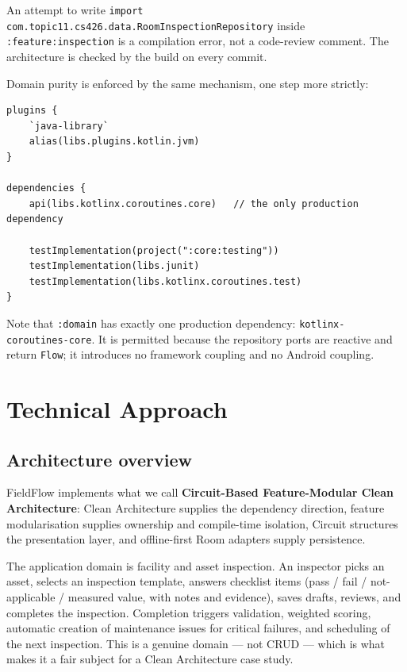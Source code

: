 \documentclass[11pt,a4paper]{article}
\newcommand{\mdl}[1]{\texttt{#1}}
\newcommand{\file}[1]{{\small\texttt{#1}}}
\begin{document}
An attempt to write \texttt{import com.topic11.cs426.data.RoomInspectionRepository}
inside \mdl{:feature:inspection} is a compilation error, not a code-review
comment. The architecture is checked by the build on every commit.

Domain purity is enforced by the same mechanism, one step more strictly:

\begin{lstlisting}[caption={\file{domain/build.gradle.kts} --- \mdl{:domain} is a
\texttt{java-library}, not an Android library. The Android SDK, Compose, Circuit
and Room are not available to it at all.}]
plugins {
    `java-library`
    alias(libs.plugins.kotlin.jvm)
}

dependencies {
    api(libs.kotlinx.coroutines.core)   // the only production dependency

    testImplementation(project(":core:testing"))
    testImplementation(libs.junit)
    testImplementation(libs.kotlinx.coroutines.test)
}
\end{lstlisting}

Note that \mdl{:domain} has exactly one production dependency:
\texttt{kotlinx-coroutines-core}. It is permitted because the repository ports
are reactive and return \texttt{Flow}; it introduces no framework coupling and
no Android coupling.

\section{Technical Approach}

\subsection{Architecture overview}

FieldFlow implements what we call \textbf{Circuit-Based Feature-Modular Clean
Architecture}: Clean Architecture supplies the dependency direction, feature
modularisation supplies ownership and compile-time isolation, Circuit structures
the presentation layer, and offline-first Room adapters supply persistence.

The application domain is facility and asset inspection. An inspector picks an
asset, selects an inspection template, answers checklist items (pass / fail /
not-applicable / measured value, with notes and evidence), saves drafts, reviews,
and completes the inspection. Completion triggers validation, weighted scoring,
automatic creation of maintenance issues for critical failures, and scheduling of
the next inspection. This is a genuine domain --- not CRUD --- which is what
makes it a fair subject for a Clean Architecture case study.
\end{document}
